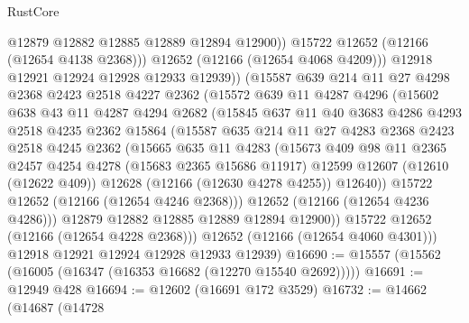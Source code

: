 \begin{lexlean}{RustCore}
\begin{coremodule}
                    @12879
                    @12882
                    @12885
                    @12889
                    @12894
                    @12900))
                @15722
                @12652
                (@12166 (@12654 @4138 @2368)))
              @12652
              (@12166 (@12654 @4068 @4209)))
            @12918
            @12921
            @12924
            @12928
            @12933
            @12939))
        (@15587
          @639
          @214
          @11
          @27
          @4298
          @2368
          @2423
          @2518
          @4227
          @2362
          (@15572
            @639
            @11
            @4287
            @4296
            (@15602
              @638
              @43
              @11
              @4287
              @4294
              @2682
              (@15845
                @637
                @11
                @40
                @3683
                @4286
                @4293
                @2518
                @4235
                @2362
                @15864
                (@15587
                  @635
                  @214
                  @11
                  @27
                  @4283
                  @2368
                  @2423
                  @2518
                  @4245
                  @2362
                  (@15665
                    @635
                    @11
                    @4283
                    (@15673
                      @409
                      @98
                      @11
                      @2365
                      @2457
                      @4254
                      @4278
                      (@15683 @2365 @15686 @11917)
                      @12599
                      @12607
                      (@12610 (@12622 @409))
                      @12628
                      (@12166 (@12630 @4278 @4255))
                      @12640))
                  @15722
                  @12652
                  (@12166 (@12654 @4246 @2368)))
                @12652
                (@12166 (@12654 @4236 @4286)))
              @12879
              @12882
              @12885
              @12889
              @12894
              @12900))
          @15722
          @12652
          (@12166 (@12654 @4228 @2368)))
        @12652
        (@12166 (@12654 @4060 @4301)))
      @12918
      @12921
      @12924
      @12928
      @12933
      @12939)
@16690 := @15557 (@15562 (@16005 (@16347 (@16353 @16682 (@12270 @15540 @2692)))))
@16691 := @12949 @428
@16694 := @12602 (@16691 @172 @3529)
@16732 := @14662
    (@14687
      (@14728

\end{coremodule}
\end{lexlean}
